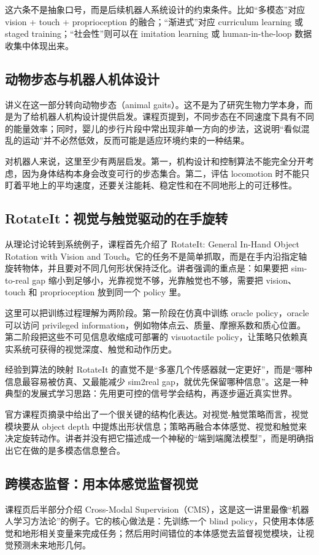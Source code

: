 \documentclass[a4paper]{article}
\begin{document}
这六条不是抽象口号，而是后续机器人系统设计的约束条件。比如“多模态”对应 vision + touch + proprioception 的融合；“渐进式”对应 curriculum learning 或 staged training；“社会性”则可以在 imitation learning 或 human-in-the-loop 数据收集中体现出来。

\subsection{动物步态与机器人机体设计}
讲义在这一部分转向动物步态（animal gaits）。这不是为了研究生物力学本身，而是为了给机器人机构设计提供启发。课程页提到，不同步态在不同速度下具有不同的能量效率；同时，婴儿的步行片段中常出现非单一方向的步法，这说明“看似混乱的运动”并不必然低效，反而可能是适应环境约束的一种结果。

对机器人来说，这里至少有两层启发。第一，机构设计和控制算法不能完全分开考虑，因为身体结构本身会改变可行的步态集合。第二，评估 locomotion 时不能只盯着平地上的平均速度，还要关注能耗、稳定性和在不同地形上的可迁移性。

\subsection{RotateIt：视觉与触觉驱动的在手旋转}
从理论讨论转到系统例子，课程首先介绍了 RotateIt: General In-Hand Object Rotation with Vision and Touch。它的任务不是简单抓取，而是在手内沿指定轴旋转物体，并且要对不同几何形状保持泛化。讲者强调的重点是：如果要把 sim-to-real gap 缩小到足够小，光靠视觉不够，光靠触觉也不够，需要把 vision、touch 和 proprioception 放到同一个 policy 里。

这里可以把训练过程理解为两阶段。第一阶段在仿真中训练 oracle policy，oracle 可以访问 privileged information，例如物体点云、质量、摩擦系数和质心位置。第二阶段把这些不可见信息收缩成可部署的 visuotactile policy，让策略只依赖真实系统可获得的视觉深度、触觉和动作历史。

\begin{knowledgebox}{经验到算法的映射}
RotateIt 的直觉不是“多塞几个传感器就一定更好”，而是“哪种信息最容易被仿真、又最能减少 sim2real gap，就优先保留哪种信息”。这是一种典型的发展式学习思路：先用更可控的信号学会结构，再逐步逼近真实世界。
\end{knowledgebox}

官方课程页摘录中给出了一个很关键的结构化表达。对视觉-触觉策略而言，视觉模块要从 object depth 中提炼出形状信息；策略再融合本体感觉、视觉和触觉来决定旋转动作。讲者并没有把它描述成一个神秘的“端到端魔法模型”，而是明确指出它在做的是多模态信息整合。

\subsection{跨模态监督：用本体感觉监督视觉}
课程页后半部分介绍 Cross-Modal Supervision（CMS），这是这一讲里最像“机器人学习方法论”的例子。它的核心做法是：先训练一个 blind policy，只使用本体感觉和地形相关变量来完成任务；然后用时间错位的本体感觉去监督视觉模块，让视觉预测未来地形几何。
\end{document}
